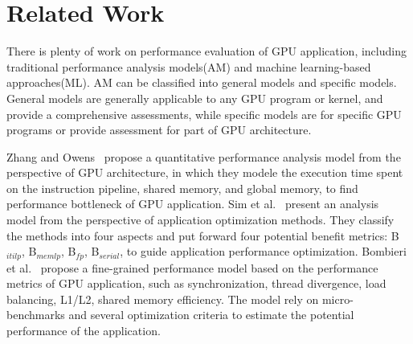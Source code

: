 \section{Related Work}







There is plenty of work on performance evaluation of GPU application, including traditional performance analysis models(AM) and machine learning-based approaches(ML). AM can be classified into general models and specific models. General models are generally applicable to any GPU program or kernel, and provide a comprehensive assessments, while specific models are for specific GPU programs or provide assessment for part of GPU architecture.

Zhang and Owens~\cite{Zhang2011A} propose a quantitative performance analysis model from the perspective of GPU architecture, in which they modele the execution time spent on the instruction pipeline, shared memory, and global memory, to find performance bottleneck of GPU application. Sim et al.~\cite{Sim2012A} present an analysis model from the perspective of application optimization methods. They classify the methods into four aspects and put forward four potential benefit metrics: B$_{itilp}$, B$_{memlp}$, B$_{fp}$, B$_{serial}$, to guide application performance optimization. Bombieri et al.~\cite{Bombieri2016A} propose a fine-grained performance model based on the performance metrics of GPU application, such as synchronization, thread divergence, load balancing, L1/L2, shared memory efficiency. The model rely on micro-benchmarks and several optimization criteria to estimate the potential performance of the application.

